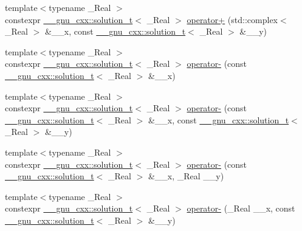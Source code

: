 \begin{DoxyCompactItemize}
\item 
{\footnotesize template$<$typename \+\_\+\+Real $>$ }\\constexpr \hyperlink{namespace____gnu__cxx_ae20ea642de50eb361074c62676b0159c}{\+\_\+\+\_\+gnu\+\_\+cxx\+::solution\+\_\+t}$<$ \+\_\+\+Real $>$ \hyperlink{namespacestd_aa471e6e6583f0beced389171490d8684}{operator+} (std\+::complex$<$ \+\_\+\+Real $>$ \&\+\_\+\+\_\+x, const \hyperlink{namespace____gnu__cxx_ae20ea642de50eb361074c62676b0159c}{\+\_\+\+\_\+gnu\+\_\+cxx\+::solution\+\_\+t}$<$ \+\_\+\+Real $>$ \&\+\_\+\+\_\+y)
\item 
{\footnotesize template$<$typename \+\_\+\+Real $>$ }\\constexpr \hyperlink{namespace____gnu__cxx_ae20ea642de50eb361074c62676b0159c}{\+\_\+\+\_\+gnu\+\_\+cxx\+::solution\+\_\+t}$<$ \+\_\+\+Real $>$ \hyperlink{namespacestd_a6cd0256e6734f6ff66ad5e4f9d4f1741}{operator-\/} (const \hyperlink{namespace____gnu__cxx_ae20ea642de50eb361074c62676b0159c}{\+\_\+\+\_\+gnu\+\_\+cxx\+::solution\+\_\+t}$<$ \+\_\+\+Real $>$ \&\+\_\+\+\_\+x)
\item 
{\footnotesize template$<$typename \+\_\+\+Real $>$ }\\constexpr \hyperlink{namespace____gnu__cxx_ae20ea642de50eb361074c62676b0159c}{\+\_\+\+\_\+gnu\+\_\+cxx\+::solution\+\_\+t}$<$ \+\_\+\+Real $>$ \hyperlink{namespacestd_ad3462eddf6b43f6e2d87b7a5fa2a2307}{operator-\/} (const \hyperlink{namespace____gnu__cxx_ae20ea642de50eb361074c62676b0159c}{\+\_\+\+\_\+gnu\+\_\+cxx\+::solution\+\_\+t}$<$ \+\_\+\+Real $>$ \&\+\_\+\+\_\+x, const \hyperlink{namespace____gnu__cxx_ae20ea642de50eb361074c62676b0159c}{\+\_\+\+\_\+gnu\+\_\+cxx\+::solution\+\_\+t}$<$ \+\_\+\+Real $>$ \&\+\_\+\+\_\+y)
\item 
{\footnotesize template$<$typename \+\_\+\+Real $>$ }\\constexpr \hyperlink{namespace____gnu__cxx_ae20ea642de50eb361074c62676b0159c}{\+\_\+\+\_\+gnu\+\_\+cxx\+::solution\+\_\+t}$<$ \+\_\+\+Real $>$ \hyperlink{namespacestd_a35af0b87e94fb38640fa36b7ec161645}{operator-\/} (const \hyperlink{namespace____gnu__cxx_ae20ea642de50eb361074c62676b0159c}{\+\_\+\+\_\+gnu\+\_\+cxx\+::solution\+\_\+t}$<$ \+\_\+\+Real $>$ \&\+\_\+\+\_\+x, \+\_\+\+Real \+\_\+\+\_\+y)
\item 
{\footnotesize template$<$typename \+\_\+\+Real $>$ }\\constexpr \hyperlink{namespace____gnu__cxx_ae20ea642de50eb361074c62676b0159c}{\+\_\+\+\_\+gnu\+\_\+cxx\+::solution\+\_\+t}$<$ \+\_\+\+Real $>$ \hyperlink{namespacestd_ae02c419877b95950c8c9630c6a4971a1}{operator-\/} (\+\_\+\+Real \+\_\+\+\_\+x, const \hyperlink{namespace____gnu__cxx_ae20ea642de50eb361074c62676b0159c}{\+\_\+\+\_\+gnu\+\_\+cxx\+::solution\+\_\+t}$<$ \+\_\+\+Real $>$ \&\+\_\+\+\_\+y)

\end{DoxyCompactItemize}
